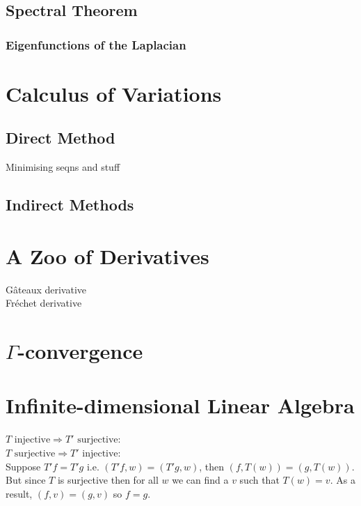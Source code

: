 \begin{remark}
\end{remark}

\subsection{Spectral Theorem}
\subsubsection{Eigenfunctions of the Laplacian}

\section{Calculus of Variations}

\subsection{Direct Method}

Minimising seqns and stuff

\subsection{Indirect Methods}

\section{A Zoo of Derivatives}

G\^ateaux derivative\\
Fr\'echet derivative

\section{$\Gamma$-convergence}

\section{Infinite-dimensional Linear Algebra}

$T \text{ injective} \Rightarrow T' \text{ surjective}$:\\



$T \text{ surjective} \Rightarrow T' \text{ injective}$:\\

Suppose $T'f = T'g$ i.e. $(T'f, w) = (T'g, w)$, then $(f, T(w)) = (g, T(w))$.
But since $T$ is surjective then for all $w$ we can find a $v$ such that
$T(w) = v$. As a result, $(f,v)=(g,v)$ so $f=g$.

